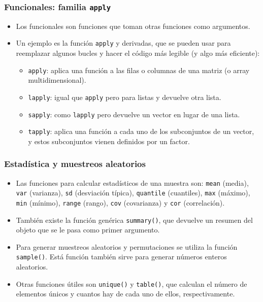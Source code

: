 \documentclass{beamer}
\begin{document}
\begin{frame}
\frametitle{Funcionales: familia \texttt{apply}}

\begin{itemize}
\item Los funcionales son funciones que toman otras funciones como argumentos.

\item Un ejemplo es la función \texttt{apply} y derivadas, que se pueden usar para reemplazar algunos bucles y hacer el código más legible (y algo más eficiente):
\begin{itemize}
\item \texttt{apply}: aplica una función a las filas o columnas de una matriz (o array multidimensional).
\item \texttt{lapply}: igual que \texttt{apply} pero para listas y devuelve otra lista.
\item \texttt{sapply}: como \texttt{lapply} pero devuelve un vector en lugar de una lista.
\item \texttt{tapply}: aplica una función a cada uno de los subconjuntos de un vector, y estos subconjuntos vienen definidos por un factor.
\end{itemize}
\end{itemize}
\end{frame}

\begin{frame}
\frametitle{Estadística y muestreos aleatorios}
\begin{itemize}
\item Las funciones para calcular estadísticos de una muestra son: \texttt{mean} (media), \texttt{var} (varianza), \texttt{sd} (desviación típica), \texttt{quantile} (cuantiles), \texttt{max} (máximo), \texttt{min} (mínimo), \texttt{range} (rango), \texttt{cov} (covarianza) y \texttt{cor} (correlación).
\item También existe la función genérica \texttt{summary()}, que devuelve un resumen del objeto que se le pasa como primer argumento.
\item Para generar muestreos aleatorios y permutaciones se utiliza la función \texttt{sample()}. Está función también sirve para generar números enteros aleatorios.
\item Otras funciones útiles son \texttt{unique()} y \texttt{table()}, que calculan el número de elementos únicos y cuantos hay de cada uno de ellos, respectivamente.
\end{itemize}
\end{frame}
\end{document}
